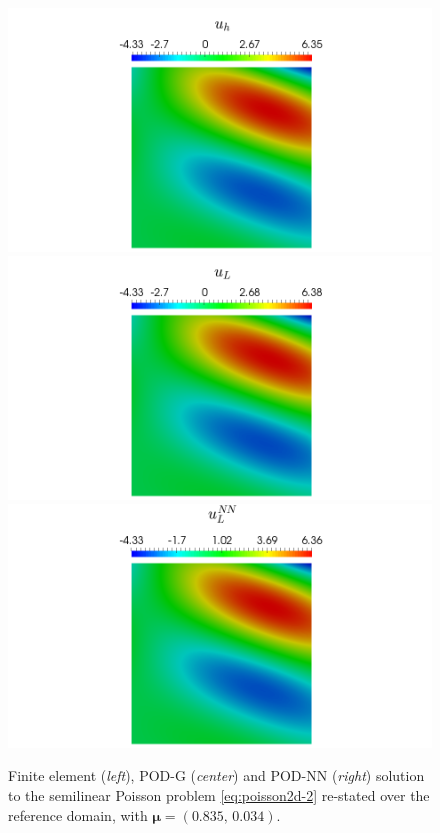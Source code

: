 \documentclass[12pt, a4paper, twoside, openright, notitlepage]{report}
\numberwithin{equation}{chapter}
\theoremstyle{theorem}
\theoremstyle{definition}
\theoremstyle{remark}
\theoremstyle{proposition}
\numberwithin{figure}{chapter}
\newcommand{\bg}[1]{\boldsymbol{#1}}
\begin{document}
		\begin{figure}[H]
			\center
			\includegraphics[scale = 0.29, trim = {8.5cm 0 8.5cm 0}, clip]{poisson2d_2_fe_solution}
			\includegraphics[scale = 0.29, trim = {8.5cm 0 8.5cm 0}, clip]{poisson2d_2_podg_solution}
			\includegraphics[scale = 0.29, trim = {8.5cm 0 8.5cm 0}, clip]{poisson2d_2_podnn_solution}
		
			\caption{Finite element (\emph{left}), POD-G (\emph{center}) and POD-NN (\emph{right}) solution to the semilinear Poisson problem \eqref{eq:poisson2d-2} re-stated over the reference domain, with $\bg{\mu} = (0.835, \, 0.034)$.}
			\label{fig:poisson2d-2-fig1}
				

\end{figure}
\end{document}
